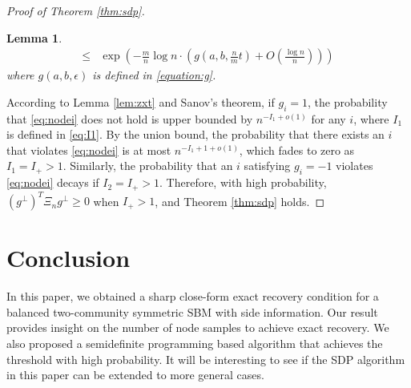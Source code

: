 \documentclass[conference]{IEEEtran}
\newtheorem{lemma}{Lemma}
\newtheorem{corollary}{Corollary}
\DeclareMathOperator{\SDP}{SDP}
\begin{document}
\begin{proof}[Proof of Theorem \ref{thm:sdp}]
\begin{lemma}
\begin{align}
			\leq &\exp(-\frac{m}{n}\log n \cdot ( g(a, b, \frac{n}{m}t) + O(\frac{\log n}{n})))
		\end{align}
		where $g(a,b,\epsilon)$ is defined in \eqref{equation:g}.
	\end{lemma}
	According to Lemma \ref{lem:zxt} and Sanov's theorem, if $g_i=1$, the probability that \eqref{eq:nodei} does not hold is upper bounded by
	$n^{-I_1 + o(1)}$ for any $i$, where $I_1$ is defined in \eqref{eq:I1}. By the union bound, the probability that there exists an $i$ that violates \eqref{eq:nodei} is at most $n^{-I_1+1 + o(1)}$, which fades to zero as $I_1=I_+>1$. 
	Similarly, the probability that an $i$ satisfying $g_i=-1$ violates \eqref{eq:nodei} decays if $I_2=I_+>1$. Therefore, with high probability, $(g^{\perp})^T \Xi_n g^{\perp}\ge0$ when $I_+>1$, and Theorem \ref{thm:sdp} holds. 
\end{proof}

	\section{Conclusion}\label{s:conclusion}In this paper, we obtained a sharp close-form exact recovery condition for a balanced two-community symmetric SBM with side information. %
	Our result provides insight on the number of node samples to achieve exact recovery. We also proposed a semidefinite programming based algorithm that achieves the threshold with high probability. It will be interesting to see if the SDP algorithm in this paper can be extended to more general cases.
	
	
\end{document}
